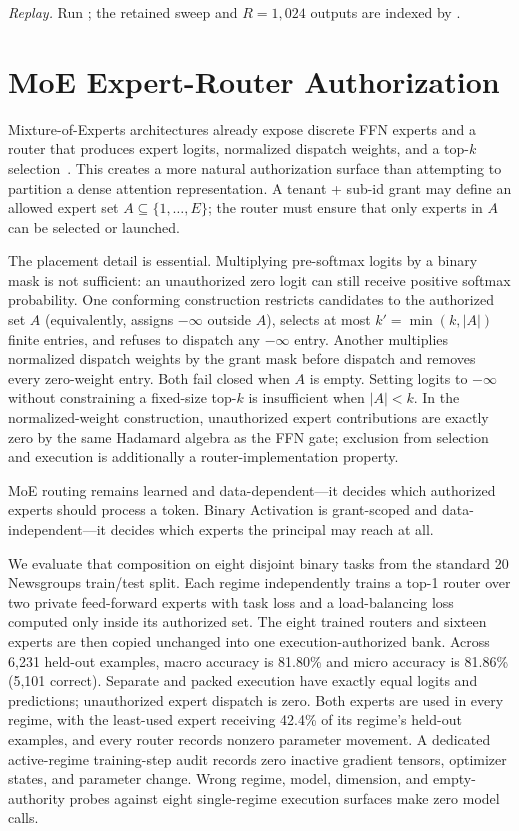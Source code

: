 \documentclass[11pt]{article}
\begin{document}
\noindent\textit{Replay.} Run
; the retained sweep and
$R=1{,}024$ outputs are indexed by
.

\section{MoE Expert-Router Authorization}

Mixture-of-Experts architectures already expose discrete FFN experts and a
router that produces expert logits, normalized dispatch weights, and a top-$k$
selection~\citep{shazeer2017moe,fedus2022switch}. This creates a more natural authorization surface than attempting to
partition a dense attention representation. A tenant + sub-id grant may define
an allowed expert set $A\subseteq\{1,\ldots,E\}$; the router must ensure that
only experts in $A$ can be selected or launched.

The placement detail is essential. Multiplying pre-softmax logits by a binary
mask is not sufficient: an unauthorized zero logit can still receive positive
softmax probability. One conforming construction restricts candidates to the
authorized set $A$ (equivalently, assigns $-\infty$ outside $A$), selects at
most $k'=\min(k,|A|)$ finite entries, and refuses to dispatch any $-\infty$
entry. Another multiplies normalized dispatch weights by the grant mask before
dispatch and removes every zero-weight entry. Both fail closed when $A$ is
empty. Setting logits to $-\infty$ without constraining a fixed-size top-$k$
is insufficient when $|A|<k$. In the normalized-weight construction,
unauthorized expert contributions are exactly zero by the same Hadamard algebra
as the FFN gate; exclusion from selection and execution is additionally a
router-implementation property.

MoE routing remains learned and data-dependent---it decides which authorized
experts should process a token. Binary Activation is grant-scoped and
data-independent---it decides which experts the principal may reach at all.

We evaluate that composition on eight disjoint binary tasks from the standard
20 Newsgroups train/test split. Each regime independently trains a top-1 router
over two private feed-forward experts with task loss and a load-balancing loss
computed only inside its authorized set. The eight trained routers and sixteen
experts are then copied unchanged into one execution-authorized bank. Across
6,231 held-out examples, macro accuracy is 81.80\% and micro accuracy is
81.86\% (5,101 correct). Separate and packed execution have exactly equal
logits and predictions; unauthorized expert dispatch is zero. Both experts are
used in every regime, with the least-used expert receiving 42.4\% of its
regime's held-out examples, and every router records nonzero parameter
movement. A dedicated active-regime training-step audit records zero inactive
gradient tensors, optimizer states, and parameter change. Wrong regime, model,
dimension, and empty-authority probes against eight single-regime execution
surfaces make zero model calls.
\end{document}
